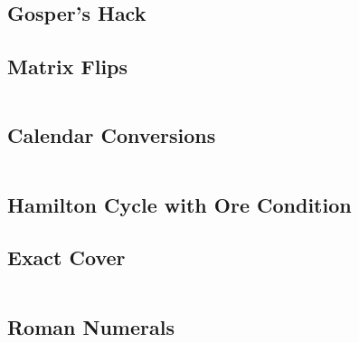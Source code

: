 \subsection{Gosper's Hack}
\subsection{Matrix Flips}

\hrulefill \vspace{-\baselineskip}
\begin{multicols}{2}
\inputminted[autogobble,fontsize=\tiny]{C++}{Misc/rotate.cpp}
\end{multicols}
\vspace{-\baselineskip}
\noindent \hrulefill

\subsection{Calendar Conversions}

\hrulefill \vspace{-\baselineskip}
\begin{multicols}{2}
\inputminted[autogobble,fontsize=\tiny]{C++}{Misc/dates.cpp}
\end{multicols}
\vspace{-\baselineskip}
\noindent \hrulefill

\subsection{Hamilton Cycle with Ore Condition}

\newpage

\subsection{Exact Cover}

\hrulefill \vspace{-\baselineskip}
\begin{multicols}{2}
\inputminted[autogobble,fontsize=\tiny]{C++}{Misc/exact_cover.cpp}
\end{multicols}
\vspace{-\baselineskip}
\noindent \hrulefill

\newpage

\subsection{Roman Numerals}

\hrulefill \vspace{-\baselineskip}
\begin{multicols}{2}
\inputminted[autogobble,fontsize=\tiny]{C++}{Misc/roman.cpp}
\end{multicols}
\vspace{-\baselineskip}
\noindent \hrulefill

